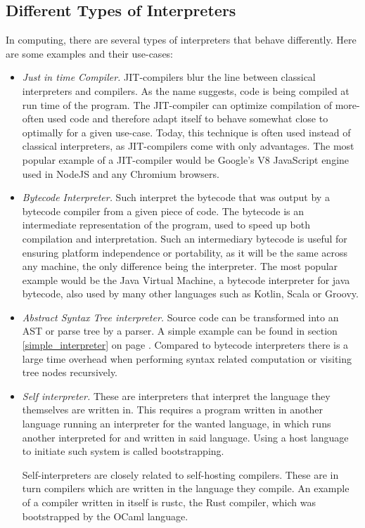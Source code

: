 \documentclass[12pt,a4paper]{article}
\begin{document}
\subsection{Different Types of Interpreters}
In computing, there are several types of interpreters that behave differently.
Here are some examples and their use-cases:
\begin{itemize}
    \item \emph{Just in time Compiler.} JIT-compilers blur the line between
        classical interpreters and compilers. As the name suggests, code is
        being compiled at run time of the program. The JIT-compiler can optimize
        compilation of more-often used code and therefore adapt itself to
        behave somewhat close to optimally for a given use-case. Today, this 
        technique is often used instead of classical interpreters, as
        JIT-compilers come with only advantages. The most popular example of
        a JIT-compiler would be Google's V8 JavaScript engine used
        in NodeJS and any Chromium browsers.
    \item \emph{Bytecode Interpreter.} Such interpret the bytecode that was
        output by a bytecode compiler from a given piece of code. The bytecode
        is an intermediate representation of the program, used to speed up
        both compilation and interpretation. Such an intermediary bytecode is
        useful for ensuring platform independence or portability, as it will be
        the same across any machine, the only difference being the interpreter.
        The most popular example would be the Java Virtual Machine,
        a bytecode interpreter for java bytecode, also used by many other languages
        such as Kotlin, Scala or Groovy.
    \item \emph{Abstract Syntax Tree interpreter.} Source code can be
        transformed into an AST or parse tree by a parser. A simple example
        can be found in section \ref{simple_interpreter}
        on page \pageref{simple_interpreter}. Compared to bytecode interpreters
        there is a large time overhead when performing syntax related computation
        or visiting tree nodes recursively.
    \item \emph{Self interpreter.} These are interpreters that interpret the
        language they themselves are written in. This requires a program
        written in another language running an interpreter for the wanted
        language, in which runs another interpreted for and written in said
        language. Using a host language to initiate such system is called
        bootstrapping.

        Self-interpreters are closely related to self-hosting compilers. These
        are in turn compilers which are written in the language they compile.
        An example of a compiler written in itself is rustc, the Rust
        compiler, which was bootstrapped by the OCaml language.
\end{itemize}
\end{document}
